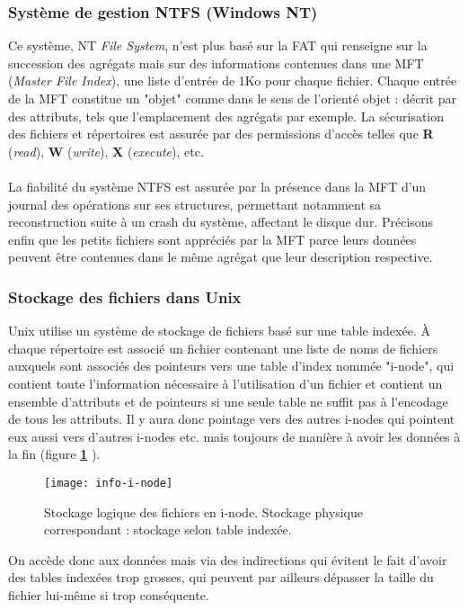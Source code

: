 \documentclass[12pt,a4paper]{report}
\begin{document}
\subsubsection{Système de gestion NTFS (Windows NT)}
Ce système, NT \textit{File System}, n'est plus basé sur la FAT qui renseigne sur la succession des agrégats mais sur des informations contenues dans une MFT (\textit{Master File Index}), une liste d'entrée de 1Ko pour chaque fichier. Chaque entrée de la MFT constitue un "objet" comme dans le sens de l'orienté objet : décrit par des attributs, tels que l'emplacement des agrégats par exemple. La sécurisation des fichiers et répertoires est assurée par des permissions d'accès telles que \textbf{R} (\textit{read}), \textbf{W} (\textit{write}), \textbf{X} (\textit{execute}), etc.\\
\\
La fiabilité du système NTFS est assurée par la présence dans la MFT d'un journal des opérations sur ses structures, permettant notamment sa reconstruction suite à un crash du système, affectant le disque dur. Précisons enfin que les petits fichiers sont appréciés par la MFT parce leurs données peuvent être contenues dans le même agrégat que leur description respective.

\subsubsection{Stockage des fichiers dans Unix}
Unix utilise un système de stockage de fichiers basé sur une table indexée. À chaque répertoire est associé un fichier contenant une liste de noms de fichiers auxquels sont associés des pointeurs vers une table d'index nommée "i-node", qui contient toute l'information nécessaire à l'utilisation d'un fichier et contient un ensemble d'attributs et de pointeurs si une seule table ne suffit pas à l'encodage de tous les attributs. Il y aura donc pointage vers des autres i-nodes qui pointent eux aussi vers d'autres i-nodes etc. mais toujours de manière à avoir les données à la fin (figure \textbf{\ref{fig:inode}} ). 
\begin{figure}[h!]
\centering
\texttt{[image: info-i-node]}
\caption{Stockage logique des fichiers en i-node. Stockage physique correspondant : stockage selon table indexée.}
\label{fig:inode}
\end{figure}
On accède donc aux données mais via des indirections qui évitent le fait d'avoir des tables indexées trop grosses, qui peuvent par ailleurs dépasser la taille du fichier lui-même si trop conséquente.
\end{document}
